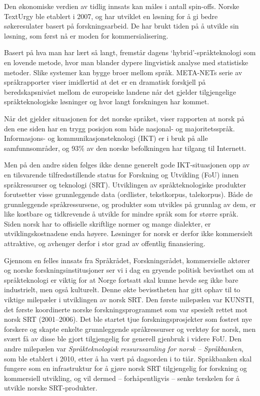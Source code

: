 \begin{multicols}{2}
Den økonomiske verdien av tidlig innsats kan måles i antall spin-offs. Norske TextUrgy ble etablert i 2007, og har utviklet en løsning for å gi bedre søkeresulater basert på forskningsarbeid. De har brukt tiden på å utvikle sin løsning, som først nå er moden for kommersialisering.


Basert på hva man har lært så langt, fremstår dagens `hybrid'-språkteknologi som en lovende metode, hvor man blander dypere lingvistisk analyse med statistiske metoder. Slike systemer kan bygge broer mellom språk. META-NETs serie av språkrapporter viser imidlertid at det er en dramatisk forskjell på beredskapsnivået mellom de europeiske landene når det gjelder tilgjengelige språkteknologiske løsninger og hvor langt forskningen har kommet.

Når det gjelder situasjonen for det norske språket, viser rapporten at norsk på den ene siden har en trygg posisjon som både nasjonal- og majoritetsspråk. Informasjons- og kommunikasjonsteknologi (IKT) er i bruk på alle samfunnsområder, og 93\% av den norske befolkningen har tilgang til Internett.

Men på den andre siden følges ikke denne generelt gode IKT-situasjonen opp av en tilsvarende tilfredsstillende status for Forskning og Utvikling (FoU) innen språkressurser og teknologi (SRT). 
Utviklingen av språkteknologiske produkter forutsetter visse grunnleggende data (ordlister, tekstkorpus, talekorpus). Både de grunnleggende språkressursene, og produkter som utvikles på grunnlag av dem, er like kostbare og tidkrevende å utvikle for mindre språk som for større språk. Siden norsk har to offisielle skriftlige normer og mange dialekter, er utviklingskostnadene enda høyere. 
Løsninger for norsk er derfor ikke kommersielt attraktive, og avhenger derfor i stor grad av offentlig finansiering.

Gjennom en felles innsats fra Språkrådet, Forskningsrådet, kommersielle aktører og norske forskningsinstitusjoner ser vi i dag en gryende politisk bevissthet om at språkteknologi er viktig for at Norge fortsatt skal kunne hevde seg ikke bare industrielt, men også kulturelt. 
Denne økte bevisstheten har gitt ophav til to viktige milepæler i utviklingen av norsk SRT.
Den første milepælen var KUNSTI, det første koordinerte norske forskningsprogrammet som var spesielt rettet mot norsk SRT (2001–2006). 
Det ble startet tjue forskningsprosjekter som fostret nye forskere og skapte enkelte grunnleggende språkressurser og verktøy for norsk, men svært få av disse ble gjort tilgjengelig for generell gjenbruk i videre FoU. 
Den andre milepælen var \textit{Språkteknologisk ressurssamling for norsk -- Språkbanken}, som ble etablert i 2010, etter å ha vært på dagsorden i to tiår. 
Språkbanken skal fungere som en infrastruktur for å gjøre norsk SRT tilgjengelig for forskning og kommersiell utvikling, og vil dermed -- forhåpentligvis -- senke terskelen for å utvikle norske SRT-produkter.


\end{multicols}
